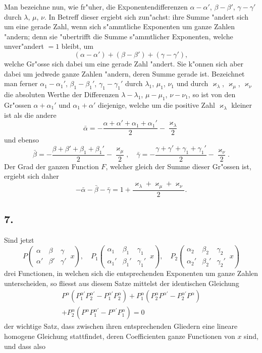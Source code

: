 \documentclass[12pt,a4paper]{article}
\begin{document}
Man bezeichne nun, wie fr{"u}her, die Exponentendifferenzen $\alpha - \alpha'$, $\beta - \beta'$, $\gamma - \gamma'$ durch $\lambda$, $\mu$, $\nu$. In Betreff dieser ergiebt sich zun{"a}chst: ihre Summe {"a}ndert sich um eine gerade Zahl, wenn sich s{"a}mmtliche Exponenten um ganze Zahlen {"a}ndern; denn sie {"u}bertrifft die Summe s{"a}mmtlicher Exponenten, welche unver{"a}ndert $= 1$ bleibt, um
\[
(\alpha - \alpha') + (\beta - \beta') + (\gamma - \gamma'),
\]
welche Gr{"o}sse sich dabei um eine gerade Zahl {"a}ndert. Sie k{"o}nnen sich aber dabei um jedwede ganze Zahlen {"a}ndern, deren Summe gerade ist. Bezeichnet man ferner $\alpha_1 - \alpha_1'$, $\beta_1 - \beta_1'$, $\gamma_1 - \gamma_1'$ durch $\lambda_1$, $\mu_1$, $\nu_1$ und durch $\varkappa_{\lambda}$, $\varkappa_{\mu}$, $\varkappa_{\nu}$ die absoluten Werthe der Differenzen $\lambda - \lambda_1$, $\mu - \mu_1$, $\nu - \nu_1$, so ist von den Gr{"o}ssen $\alpha + \alpha_1'$ und $\alpha_1 + \alpha'$ diejenige, welche um die positive Zahl $\varkappa_{\lambda}$ kleiner ist als die andere
\[
\bar{\alpha} = -\frac{\alpha + \alpha' + \alpha_1 + \alpha_1'}{2} - \frac{\varkappa_{\lambda}}{2}
\]
und ebenso
\[
\bar{\beta} = -\frac{\beta + \beta' + \beta_1 + \beta_1'}{2} - \frac{\varkappa_{\mu}}{2}, \quad
\bar{\gamma} = -\frac{\gamma + \gamma' + \gamma_1 + \gamma_1'}{2} - \frac{\varkappa_{\nu}}{2}.
\]
Der Grad der ganzen Function $F$, welcher gleich der Summe dieser Gr{"o}ssen ist, ergiebt sich daher
\[
-\bar{\alpha} - \bar{\beta} - \bar{\gamma} = 1 + \frac{\varkappa_{\lambda} + \varkappa_{\mu} + \varkappa_{\nu}}{2}.
\]

\subsection*{7.}

Sind jetzt
\[
P\left(\begin{array}{ccc|} \alpha & \beta & \gamma \\ \alpha' & \beta' & \gamma' \end{array}\, x\right), \quad
P_1\left(\begin{array}{ccc|} \alpha_1 & \beta_1 & \gamma_1 \\ \alpha_1' & \beta_1' & \gamma_1' \end{array}\, x\right), \quad
P_2\left(\begin{array}{ccc|} \alpha_2 & \beta_2 & \gamma_2 \\ \alpha_2' & \beta_2' & \gamma_2' \end{array}\, x\right)
\]
drei Functionen, in welchen sich die entsprechenden Exponenten um ganze Zahlen unterscheiden, so fliesst aus diesem Satze mittelst der identischen Gleichung
\begin{multline*}
P^{\alpha} (P_1^{\alpha'} P_2^{\alpha'} - P_1^{\alpha'} P_2^{\alpha}) + P_1^{\alpha} (P_2^{\alpha} P^{\alpha'} - P_2^{\alpha'} P^{\alpha}) \\
+ P_2^{\alpha} (P^{\alpha} P_1^{\alpha'} - P^{\alpha'} P_1^{\alpha}) = 0
\end{multline*}
der wichtige Satz, dass zwischen ihren entsprechenden Gliedern eine lineare homogene Gleichung stattfindet, deren Coefficienten ganze Functionen von $x$ sind, und dass also
\end{document}
